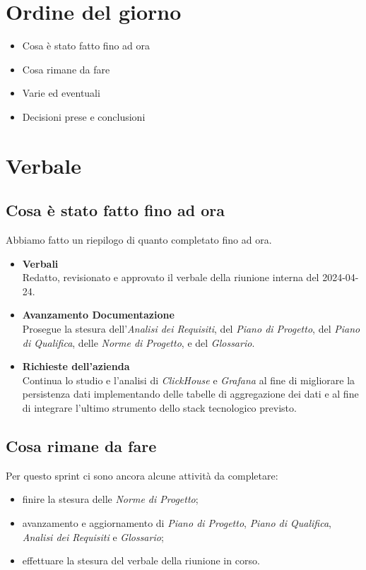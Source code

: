 \documentclass[italian,12pt]{article}
\begin{document}
\section{Ordine del giorno}
\begin{itemize}
	\item Cosa è stato fatto fino ad ora
	\item Cosa rimane da fare
	\item Varie ed eventuali
	\item Decisioni prese e conclusioni
\end{itemize}

\newpage

\section{Verbale}

\subsection{Cosa è stato fatto fino ad ora}
Abbiamo fatto un riepilogo di quanto completato fino ad ora.
\begin{itemize}
	\item \textbf{Verbali} \\
	Redatto, revisionato e approvato il verbale della riunione interna del 2024-04-24.
	\item \textbf{Avanzamento Documentazione} \\
	Prosegue la stesura dell'\textit{Analisi dei Requisiti}, del \textit{Piano di Progetto}, del \textit{Piano di Qualifica}, delle \textit{Norme di Progetto}, e del 
	\textit{Glossario}.
	\item \textbf{Richieste dell'azienda} \\
	Continua lo studio e l'analisi di \textit{ClickHouse} e \textit{Grafana} al fine di migliorare la persistenza dati implementando delle tabelle di aggregazione dei dati e al fine di integrare l'ultimo strumento dello stack tecnologico previsto.
\end{itemize}

\subsection{Cosa rimane da fare}
Per questo sprint ci sono ancora alcune attività da completare:
\begin{itemize}
	\item finire la stesura delle \textit{Norme di Progetto};
	\item avanzamento e aggiornamento di \textit{Piano di Progetto}, \textit{Piano di Qualifica}, \textit{Analisi dei Requisiti} e \textit{Glossario};
	\item effettuare la stesura del verbale della riunione in corso.
\end{itemize}
\end{document}
